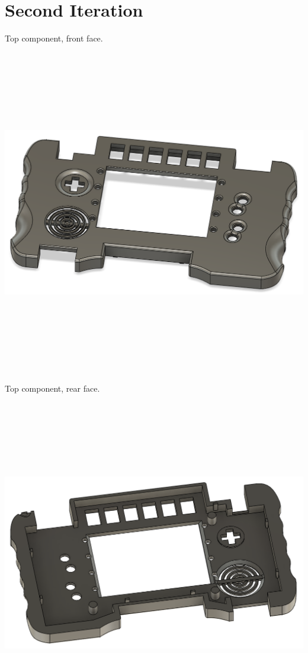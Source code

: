 \section{Second Iteration}
Top component, front face. \newline
\includegraphics[width=15cm,height=15cm,keepaspectratio]{Figures/iteration2_top_front.png} \newline
Top component, rear face. \newline
\includegraphics[width=15cm,height=15cm,keepaspectratio]{Figures/iteration2_top_back.png} \newpage
